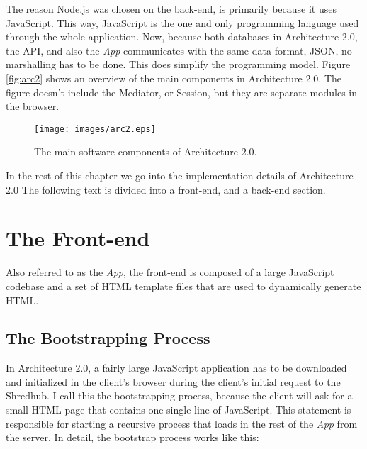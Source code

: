 The reason Node.js was chosen on the back-end, is primarily because it uses JavaScript. This way, JavaScript is the one and only programming language used through the whole application. Now, because both databases in Architecture 2.0, the API, and also the \textit{App} communicates with the same data-format, JSON, no marshalling has to be done. This does simplify the programming model. Figure \vref{fig:arc2} shows an overview of the main components in Architecture 2.0. The figure doesn't include the Mediator, or Session, but they are separate modules in the browser.

 \begin{figure}[h]
  \centering
  \texttt{[image: images/arc2.eps]}
  \caption[sp.]
   {The main software components of Architecture 2.0.}
    \label{fig:arc2}
\end{figure}



In the rest of this chapter we go into the implementation details of Architecture 2.0 The following text is divided into a front-end, and a back-end section.

\section{The Front-end}
Also referred to as the \textit{App}, the front-end is composed of a large JavaScript codebase and a set of HTML template files that are used to dynamically generate HTML. 

\subsection{The Bootstrapping Process}
In Architecture 2.0, a fairly large JavaScript application has to be downloaded and initialized in the client's browser during the client's initial request to the Shredhub. I call this the bootstrapping process, because the client will ask for a small HTML page that contains one single line of JavaScript. This statement is responsible for starting a recursive process that loads in the rest of the \textit{App} from the server. In detail, the bootstrap process works like this:

